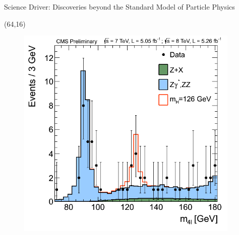 \documentclass[final]{beamer}
\begin{document}
\begin{frame}{}
\begin{textblock}{80.0}
\begin{block}{Science Driver: Discoveries beyond the Standard Model of Particle Physics}
\begin{textblock}{16.0}(64,16)
\begin{figure}[H]
\includegraphics[width=0.95\textwidth]{images/Fig4-ZZMass_7Plus8TeV_70-180_3GeV.png}
\end{figure}
\end{textblock}

\end{block}
\end{textblock}




\end{frame}
\end{document}
